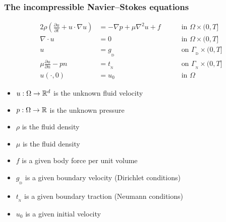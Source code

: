 \begin{frame}
  \frametitle{The incompressible Navier--Stokes equations}

  \vspace{-0.5cm} 
  \begin{alignat*}{2}
    \rho (\frac{\partial u}{\partial t} + u \cdot \nabla u)
    &=  -\nabla p  + \mu \nabla^2 u + f && \quad \text{ in } \Omega \times (0, T] \\
    \nabla \cdot u &= 0 && \quad \text{ in } \Omega \times (0, T] \\
    u &= g_{_\mathrm{D}} && \quad \text{ on } \Gamma_{_\mathrm{D}} \times (0, T] \\
    \mu \frac{\partial u}{\partial n} - p n  &= t_{_\mathrm{N}} && \quad \text{ on } \Gamma_{_\mathrm{N}} \times (0, T] \\
    u(\cdot, 0) &= u_0 && \quad \text{ in } \Omega
  \end{alignat*}

  \linespread{1}
  \begin{itemize}
  \item
    $u : \Omega \rightarrow \mathbb{R}^d$ is the \alert{unknown} fluid velocity 
  \item 
    $p : \Omega \rightarrow \mathbb{R}$ is the \alert{unknown} pressure
  \item
    $\rho$ is the fluid density
  \item
    $\mu$ is the fluid density  
  \item
    $f$ is a given body force per unit volume
  \item
    $g_{_\mathrm{D}}$ is a given boundary velocity (Dirichlet conditions)
  \item
    $t_{_\mathrm{N}}$ is a given boundary traction (Neumann conditions)
  \item
    $u_0$ is a given initial velocity
  \end{itemize}
  \linespread{1.5}



\end{frame}
